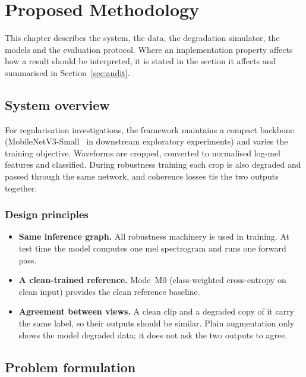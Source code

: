 \chapter{Proposed Methodology}
\label{ch:methodology}

This chapter describes the system, the data, the degradation simulator, the models and the evaluation protocol. Where an implementation property affects how a result should be interpreted, it is stated in the section it affects and summarised in Section~\ref{sec:audit}.

\section{System overview}
\label{sec:overview}

For regularisation investigations, the framework maintains a compact backbone (MobileNetV3-Small~\cite{howard2019mobilenetv3} in downstream exploratory experiments) and varies the training objective. Waveforms are cropped, converted to normalised log-mel features and classified. During robustness training each crop is also degraded and passed through the same network, and coherence losses tie the two outputs together.

\subsection{Design principles}

\begin{itemize}
  \item \textbf{Same inference graph.} All robustness machinery is used in training. At test time the model computes one mel spectrogram and runs one forward pass.
  \item \textbf{A clean-trained reference.} Mode~M0 (class-weighted cross-entropy on clean input) provides the clean reference baseline.
  \item \textbf{Agreement between views.} A clean clip and a degraded copy of it carry the same label, so their outputs should be similar. Plain augmentation only shows the model degraded data; it does not ask the two outputs to agree.
\end{itemize}



\section{Problem formulation}
\label{sec:formulation}

